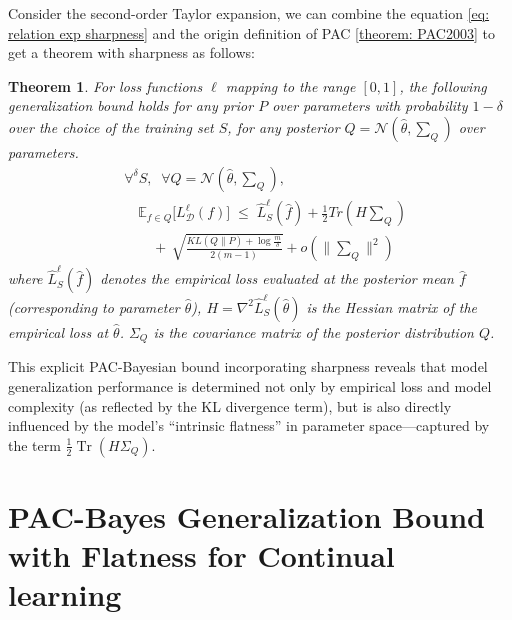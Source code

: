 \documentclass[letterpaper]{article} %
\newtheorem{theorem}{Theorem}
\begin{document}
Consider the second-order Taylor expansion, we can combine the equation \ref{eq: relation exp sharpness} and the origin definition of PAC \ref{theorem: PAC2003} to get a theorem with sharpness as follows: 

\begin{theorem} \label{theorem: PAC-sharpness}
For loss functions $\ell$ mapping to the range $[0,1]$, the following generalization bound holds for any prior $P$ over parameters with probability $1 - \delta$ over the choice of the training set $S$, for any posterior $Q=\mathcal{N}(\hat{\theta},\sum_{Q})$ over parameters.
\begin{equation}\label{eq:PAC with flatness}
\begin{aligned}
    &\forall^{\delta} S,\;\; \forall Q=\mathcal{N}(\hat{\theta},\sum_{Q}), \\
    &\quad
    \mathbb{E}_{{f} \in Q}\big[L_{\mathcal{D}}^{\ell}(f)\big] \;\leq\;
   \widehat{L}^{\ell}_{S}(\hat{f}) +  \frac{1}{2}Tr(H\sum_Q) \\
    &\qquad
    +\, \sqrt{
        \frac{
            KL(Q\|P) + \log\frac{m}{\delta}
        }{
            2(m-1)
        }
    } 
    +o(\|\sum_Q\|^2)
\end{aligned}
\end{equation}
where  $\hat{L}_S^\ell(\hat{f})$ denotes the empirical loss evaluated at the posterior mean $\hat{f}$ (corresponding to parameter $\hat{\theta}$),
$H = \nabla^2 \hat{L}_S^\ell(\hat{\theta})$ is the Hessian matrix of the empirical loss at $\hat{\theta}$. $\Sigma_Q$ is the covariance matrix of the posterior distribution $Q$.
\end{theorem}
 This explicit PAC-Bayesian bound incorporating sharpness reveals that model generalization performance is determined not only by empirical loss and model complexity (as reflected by the KL divergence term), but is also directly influenced by the model’s “intrinsic flatness” in parameter space—captured by the term $\frac{1}{2} \operatorname{Tr}(H\Sigma_Q)$. 


\section{PAC-Bayes Generalization Bound with Flatness for Continual learning}
\end{document}
